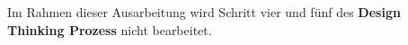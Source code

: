 Im Rahmen dieser Ausarbeitung wird Schritt vier und fünf des \textbf{Design Thinking Prozess} nicht bearbeitet.\\